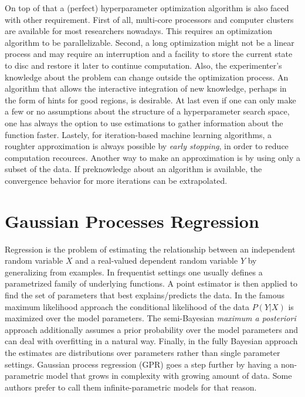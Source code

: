 \documentclass[english]{article}
\begin{document}
On top of that a (perfect) hyperparameter optimization algorithm is also faced with other requirement. First of all, multi-core processors and computer clusters are available for most researchers nowadays. This requires an optimization algorithm to be parallelizable. Second, a long optimization might not be a linear process and may require an interruption and a facility to store the current state to disc and restore it later to continue computation. Also, the experimenter's knowledge about the problem can change outside the optimization process. An algorithm that allows the interactive integration of new knowledge, perhaps in the form of hints for good regions, is desirable.
At last even if one can only make a few or no assumptions about the structure of a hyperparameter search space, one has always the option to use estimations to gather information about the function faster.
Lastely, for iteration-based machine learning algorithms, a roughter approximation is always possible by \textit{early stopping}, in order to reduce computation recources. Another way to make an approximation is by using only a subset of the data. If preknowledge about an algorithm is available, the convergence behavior for more iterations can be extrapolated.



\section{Gaussian Processes Regression}
\label{GPR}
Regression is the problem of estimating the relationship between an independent random variable $X$ and a real-valued dependent random variable $Y$ by generalizing from examples. In frequentist settings one usually defines a parametrized family of underlying functions. A point estimator is then applied to find the set of parameters that best explains/predicts the data. In the famous maximum likelihood approach the conditional likelihood of the data $P(Y|X)$ is maximized over the model parameters. The semi-Bayesian \textit{maximum a posteriori} approach additionally assumes a prior probability over the model parameters and can deal with overfitting in a natural way. Finally, in the fully Bayesian approach the estimates are distributions over parameters rather than single parameter settings. Gaussian process  regression (GPR) goes a step further by having a non-parametric model that grows in complexity with growing amount of data. Some authors prefer to call them infinite-parametric models for that reason.
\end{document}
